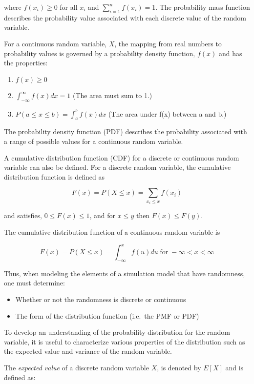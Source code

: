 \documentclass[
]{book}
\theoremstyle{definition}
\theoremstyle{definition}
\theoremstyle{definition}
\theoremstyle{definition}
\theoremstyle{remark}
\begin{document}
where \(f(x_i) \geq 0\) for all \(x_i\) and
\(\sum\nolimits_{i = 1}^{n} f(x_i) = 1\). The probability mass function
describes the probability value associated with each discrete value of
the random variable.

For a continuous random variable, \(X\), the mapping from real numbers to
probability values is governed by a probability density function, \(f(x)\)
and has the properties:

\begin{enumerate}
\def\labelenumi{\arabic{enumi}.}
\item
  \(f(x) \geq 0\)
\item
  \(\int_{-\infty}^\infty f(x)dx = 1\) (The area must sum to 1.)
\item
  \(P(a \leq x \leq b) = \int_a^b f(x)dx\) (The area under f(x) between
  a and b.)
\end{enumerate}

The probability density function (PDF) describes the probability
associated with a range of possible values for a continuous random
variable.

A cumulative distribution function (CDF) for a discrete or continuous
random variable can also be defined. For a discrete random variable, the
cumulative distribution function is defined as

\[F(x) = P(X \leq x) = \sum_{x_i \leq x} f(x_i)\]

and satisfies, \(0 \leq F(x) \leq 1\), and for \(x \leq y\) then
\(F(x) \leq F(y)\).

The cumulative distribution function of a continuous random variable is

\[F(x) = P(X \leq x) = \int_{-\infty}^x f(u) du \; \text{for} \; -\infty < x < \infty\]

Thus, when modeling the elements of a simulation model that have
randomness, one must determine:

\begin{itemize}
\item
  Whether or not the randomness is discrete or continuous
\item
  The form of the distribution function (i.e.~the PMF or PDF)
\end{itemize}

To develop an understanding of the probability distribution for the
random variable, it is useful to characterize various properties of the
distribution such as the expected value and variance of the random
variable.

The \emph{expected value} of a discrete random variable \(X\), is denoted by
\(E[X]\) and is defined as:
\end{document}
